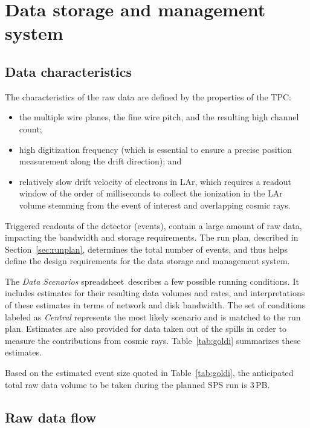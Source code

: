\section{Data storage and management system}

\subsection{Data characteristics}
The characteristics of the raw \pdsp data are defined by the
properties of the TPC:
\begin{itemize}
\item the multiple wire planes, the fine wire pitch, and the resulting high channel count;
\item high digitization frequency (which is essential to ensure a precise position measurement along the drift direction); and
\item relatively slow drift velocity of electrons in LAr, which requires a readout window of the order of milliseconds  to collect
the ionization in the LAr volume stemming from the event of interest and overlapping cosmic rays.
\end{itemize}

Triggered readouts of the detector (events), 
contain a large amount of raw data, impacting the bandwidth and
storage requirements.   The run plan, described in Section~\ref{sec:runplan},  determines the total number of events, and thus 
helps define the design requirements for the data storage and management system.

The \textit{\pdsp Data Scenarios} spreadsheet\,\cite{data_spreadsheet}  %
describes a few possible running conditions. It includes estimates for their
resulting data volumes and rates, and interpretations of these estimates in terms of
network and disk bandwidth. The set of conditions labeled as \textit{Central} represents the most likely scenario
and is matched to the run plan.
Estimates are also provided for data taken out of the spills in order to measure the contributions from cosmic rays.
Table~\ref{tab:goldi} summarizes these estimates.

Based on the estimated event size quoted in Table~\ref{tab:goldi},  the anticipated total raw data volume to be 
taken during the planned SPS run is 3\,PB.



\subsection{Raw data flow}
\label{sec:raw_concept}

